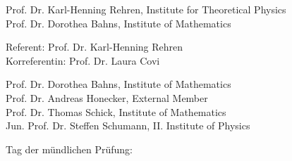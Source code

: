 \thispagestyle{empty}

\hfill

\vfill


\bigskip

\noindent {}

\medskip
\noindent Prof. Dr. Karl-Henning Rehren, Institute for Theoretical Physics\\
Prof. Dr. Dorothea Bahns, Institute of Mathematics\\

\bigskip 
\noindent {}

\medskip
\noindent Referent: Prof. Dr. Karl-Henning Rehren \\
Korreferentin: Prof. Dr. Laura Covi \\

\bigskip 
\noindent {}

\medskip
\noindent 
Prof. Dr. Dorothea Bahns, Institute of Mathematics\\
Prof. Dr. Andreas Honecker, External Member\\
Prof. Dr. Thomas Schick, Institute of Mathematics\\
Jun. Prof. Dr. Steffen Schumann, II. Institute of Physics



\vspace{2cm}
Tag der m\"undlichen Pr\"ufung: 